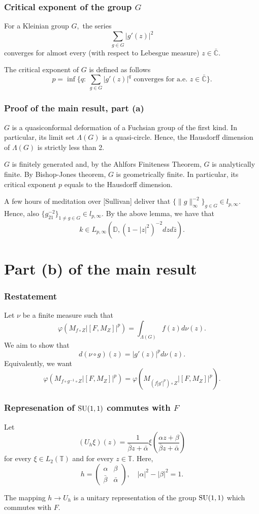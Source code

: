 \documentclass{beamer}
\theoremstyle{definition}
\begin{document}
\begin{frame}
\frametitle{Critical exponent of the group $G$}
For a Kleinian group $G,$ the series
$$\sum_{g\in G}|g'(z)|^2$$
converges for almost every (with respect to Lebesgue measure) $z\in\bar{\mathbb{C}}.$

The critical exponent of $G$ is defined as follows
$$p=\inf\Big\{q:\ \sum_{g\in G}|g'(z)|^q\mbox{ converges for a.e. }z\in\bar{\mathbb{C}}\Big\}.$$
\end{frame}



\begin{frame}
\frametitle{Proof of the main result, part (a)}
$G$  is a quasiconformal deformation of a Fuchsian group of the first kind. In particular, its limit set $\Lambda(G)$ is a quasi-circle. Hence, the Hausdorff dimension of $\Lambda(G)$ is strictly less than 2.

$G$ is finitely generated and, by the Ahlfors Finiteness Theorem, $G$ is analytically finite. By Bishop-Jones theorem, $G$ is geometrically finite. In particular, its critical exponent $p$ equals to the Hausdorff dimension.

A few hours of meditation over [Sullivan] deliver that $\{\|g\|_{\infty}^{-2}\}_{g\in G}\in l_{p,\infty}.$ Hence, also $\{g_{21}^{-2}\}_{1\neq g\in G}\in l_{p,\infty}.$ By the above lemma, we have that 
$$k\in L_{p,\infty}(\mathbb{D},(1-|z|^2)^{-2}dzd\bar{z}).$$
\end{frame}

\section{Part (b) of the main result}

\begin{frame}
\frametitle{Restatement}
Let $\nu$ be a finite measure such that
$$\varphi(M_{f\circ Z}|[F,M_Z]|^p)=\int_{\Lambda(G)}f(z)d\nu(z).$$
We aim to show that
$$d(\nu\circ g)(z)=|g'(z)|^pd\nu(z).$$
Equivalently, we want 
$$\varphi(M_{f\circ g^{-1}\circ Z}|[F,M_Z]|^p)=\varphi(M_{(f|g'|^p)\circ Z}|[F,M_Z]|^p).$$
\end{frame}

\begin{frame}
\frametitle{Represenation of ${\rm SU}(1,1)$ commutes with $F$}
Let
$$(U_h\xi)(z)=\frac1{\bar{\beta}z+\bar{\alpha}}\xi(\frac{\alpha z+\beta}{\bar{\beta}z+\bar{\alpha}})$$
for every $\xi\in L_2(\mathbb{T})$ and for every $z\in\mathbb{T}.$ Here,
$$h=
\begin{pmatrix}
\alpha&\beta\\
\bar{\beta}&\bar{\alpha}
\end{pmatrix},\quad
|\alpha|^2-|\beta|^2=1.
$$

\begin{lemma} The mapping $h\to U_h$ is a unitary representation of the group ${\rm SU}(1,1)$ which commutes with $F.$
\end{lemma}
\end{frame}
\end{document}
